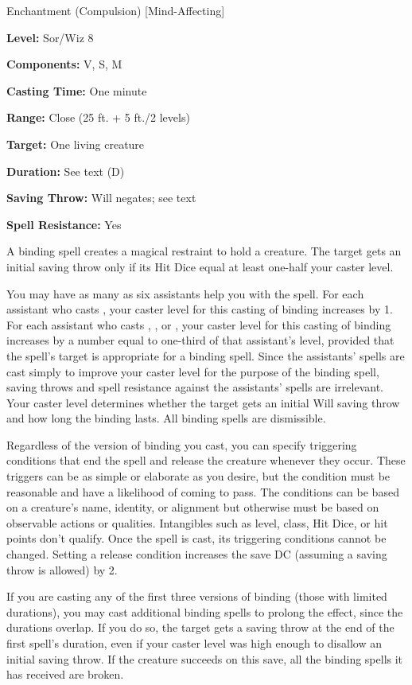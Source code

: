 
Enchantment (Compulsion) [Mind-Affecting]

\textbf{Level:} Sor/Wiz 8

\textbf{Components:} V, S, M

\textbf{Casting Time:} One minute

\textbf{Range:} Close (25 ft. + 5 ft./2 levels)

\textbf{Target:} One living creature

\textbf{Duration:} See text (D)

\textbf{Saving Throw:} Will negates; see text

\textbf{Spell Resistance:} Yes

A binding spell creates a magical restraint to hold a creature. The target 
gets an initial saving throw only if its Hit Dice equal at least one-half your 
caster level.

You may have as many as six assistants help you with the spell. For each assistant 
who casts , your caster level for this casting of binding 
increases by 1. For each assistant who casts , , or , your caster level for this casting of binding increases by a number equal to one-third of that assistant's level, provided that 
the spell's target is appropriate for a binding spell. Since the assistants' 
spells are cast simply to improve your caster level for the purpose of the binding spell, saving throws and spell resistance against the assistants' spells are irrelevant. 
Your caster level determines whether the target gets an initial Will saving throw 
and how long the binding lasts. All binding spells are dismissible.

Regardless of the version of binding you cast, you can specify triggering 
conditions that end the spell and release the creature whenever they occur. These 
triggers can be as simple or elaborate as you desire, but the condition must be 
reasonable and have a likelihood of coming to pass. The conditions can be based 
on a creature's name, identity, or alignment but otherwise must be based on observable 
actions or qualities. Intangibles such as level, class, Hit Dice, or hit points 
don't qualify. Once the spell is cast, its triggering conditions cannot be changed. 
Setting a release condition increases the save DC (assuming a saving throw is allowed) 
by 2.

If you are casting any of the first three versions of binding (those with 
limited durations), you may cast additional binding spells to prolong 
the effect, since the durations overlap. If you do so, the target gets a saving 
throw at the end of the first spell's duration, even if your caster level was high 
enough to disallow an initial saving throw. If the creature succeeds on this save, 
all the binding spells it has received are broken.

